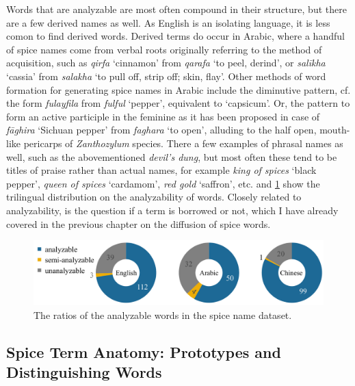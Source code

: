 Words that are analyzable are most often compound in their structure, but there are a few derived names as well. As English is an isolating language, it is less comon to find derived words. Derived terms do occur in Arabic, where a handful of spice names come from verbal roots originally referring to the method of acquisition, such as \textit{qirfa} `cinnamon' from \textit{qarafa} `to peel, derind', or \textit{salīkha} `cassia' from \textit{salakha} `to pull off, strip off; skin, flay'. Other methods of word formation for generating spice names in Arabic include the diminutive pattern, cf. the form \textit{fulayfila} from \textit{fulful} `pepper', equivalent to `capsicum'. Or, the pattern to form an active participle in the feminine as it has been proposed in case of \textit{fāghira} `Sichuan pepper' from \textit{faghara} `to open', alluding to the half open, mouth-like pericarps of \textit{Zanthozylum} species. There a few examples of phrasal names as well, such as the abovementioned \textit{devil's dung}, but most often these tend to be titles of praise rather than  actual names, for example \textit{king of spices} `black pepper', \textit{queen of spices} `cardamom', \textit{red gold} `saffron', etc.  and \cref{fig:analyzability_tripie} show the trilingual distribution on the analyzability of words. Closely related to analyzability, is the question if a term is borrowed or not, which I have already covered in the previous chapter on the diffusion of spice words.

  \begin{figure}[ht!]
    \includegraphics[width=\linewidth]{imgs/plots/analyzability_tripie.pdf}
    \caption{The ratios of the analyzable words in the spice name dataset.}
    \label{fig:analyzability_tripie}
  \end{figure}



\subsection{Spice Term Anatomy: Prototypes and Distinguishing Words}

